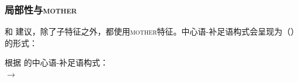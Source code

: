 \subsubsection{局部性与\textsc{mother}}
\label{sec-mother}

\mbox{} \citet*[475--489]{SWB2003a}和 \citet{Sag2007a,Sag2012a}建议，除了子特征之外，都使用\textsc{mother}特征。中心语-补足语构式会呈现为（）的形式：

\eas
根据 \citet*[481]{SWB2003a}的中心语-补足语构式：\\
 $\to$\\
\zs

